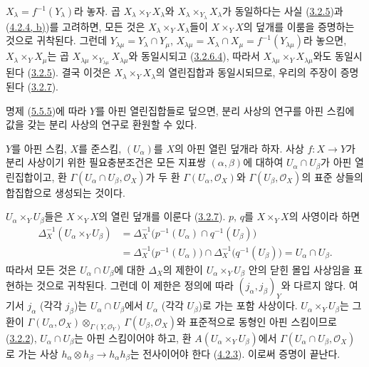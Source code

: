 $X_\lambda=f^{-1}(Y_\lambda)$라 놓자. 곱
$X_\lambda\times_Y X_\lambda$와
$X_\lambda\times_{Y_\lambda}X_\lambda$가 동일하다는 사실
(\hyperref[I.3.2.5-ko]{3.2.5})과
(\hyperref[I.4.2.4-ko]{4.2.4, b)})를 고려하면, 모든 것은
$X_\lambda\times_Y X_\lambda$들이 $X\times_Y X$의 덮개를 이룸을
증명하는 것으로 귀착된다. 그런데
$Y_{\lambda\mu}=Y_\lambda\cap Y_\mu$,
$X_{\lambda\mu}=X_\lambda\cap X_\mu=f^{-1}(Y_{\lambda\mu})$라 놓으면,
$X_\lambda\times_Y X_\mu$는 곱
$X_{\lambda\mu}\times_{Y_{\lambda\mu}}X_{\lambda\mu}$와 동일시되고
(\hyperref[I.3.2.6.4-ko]{3.2.6.4}), 따라서
$X_{\lambda\mu}\times_Y X_{\lambda\mu}$와도 동일시된다
(\hyperref[I.3.2.5-ko]{3.2.5}). 결국 이것은
$X_\lambda\times_Y X_\lambda$의 열린집합과 동일시되므로, 우리의
주장이 증명된다 (\hyperref[I.3.2.7-ko]{3.2.7}).

명제 (\hyperref[I.5.5.5-ko]{5.5.5})에 따라 $Y$를 아핀 열린집합들로
덮으면, 분리 사상의 연구를 아핀 스킴에 값을 갖는 분리 사상의
연구로 환원할 수 있다.

\begin{proposition}[5.5.6]
\label{I.5.5.6-ko}
$Y$를 아핀 스킴, $X$를 준스킴, $(U_\alpha)$를 $X$의 아핀 열린
덮개라 하자. 사상 $f:X\to Y$가 분리 사상이기 위한 필요충분조건은
모든 지표쌍 $(\alpha,\beta)$에 대하여 $U_\alpha\cap U_\beta$가 아핀
열린집합이고, 환 $\Gamma(U_\alpha\cap U_\beta,\mathscr{O}_X)$가 두 환
$\Gamma(U_\alpha,\mathscr{O}_X)$와
$\Gamma(U_\beta,\mathscr{O}_X)$의 표준 상들의 합집합으로 생성되는
것이다.
\end{proposition}

$U_\alpha\times_Y U_\beta$들은 $X\times_Y X$의 열린 덮개를 이룬다
(\hyperref[I.3.2.7-ko]{3.2.7}). $p$, $q$를 $X\times_Y X$의 사영이라
하면
\[
  \begin{aligned}
    \Delta_X^{-1}(U_\alpha\times_Y U_\beta)
      &=\Delta_X^{-1}\bigl(p^{-1}(U_\alpha)\cap q^{-1}(U_\beta)\bigr)\\
      &=\Delta_X^{-1}\bigl(p^{-1}(U_\alpha)\bigr)
        \cap\Delta_X^{-1}\bigl(q^{-1}(U_\beta)\bigr)
        =U_\alpha\cap U_\beta.
  \end{aligned}
\]
따라서 모든 것은 $U_\alpha\cap U_\beta$에 대한 $\Delta_X$의 제한이
$U_\alpha\times_Y U_\beta$ 안의 닫힌 몰입 사상임을 표현하는 것으로
귀착된다. 그런데 이 제한은 정의에 따라
$(j_\alpha,j_\beta)_Y$와 다르지 않다. 여기서 $j_\alpha$ (각각
$j_\beta$)는 $U_\alpha\cap U_\beta$에서 $U_\alpha$ (각각
$U_\beta$)로 가는 포함 사상이다.
$U_\alpha\times_Y U_\beta$는 그 환이
$\Gamma(U_\alpha,\mathscr{O}_X)
 \otimes_{\Gamma(Y,\mathscr{O}_Y)}
 \Gamma(U_\beta,\mathscr{O}_X)$와 표준적으로 동형인 아핀 스킴이므로
(\hyperref[I.3.2.2-ko]{3.2.2}), $U_\alpha\cap U_\beta$는 아핀
스킴이어야 하고, 환 $A(U_\alpha\times_Y U_\beta)$에서
$\Gamma(U_\alpha\cap U_\beta,\mathscr{O}_X)$로 가는 사상
$h_\alpha\otimes h_\beta\to h_\alpha h_\beta$는 전사이어야 한다
(\hyperref[I.4.2.3-ko]{4.2.3}). 이로써 증명이 끝난다.

